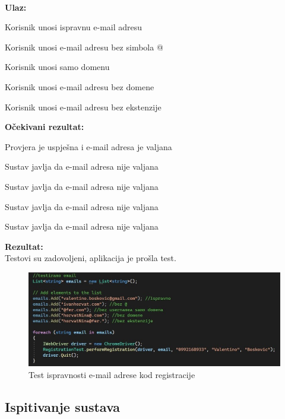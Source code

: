 			\noindent {}\\
			\textbf{Ulaz: }	
			\begin{packed_enum}
				\item Korisnik unosi ispravnu e-mail adresu
				\item Korisnik unosi e-mail adresu bez simbola @
				\item Korisnik unosi samo domenu
				\item Korisnik unosi e-mail adresu bez domene
				\item Korisnik unosi e-mail adresu bez ekstenzije
				
			\end{packed_enum}
			
			\noindent \textbf{Očekivani rezultat:}
			
			\begin{packed_enum}
				\item Provjera je uspješna i e-mail adresa je valjana
				\item Sustav javlja da e-mail adresa nije valjana
				\item Sustav javlja da e-mail adresa nije valjana
				\item Sustav javlja da e-mail adresa nije valjana
				\item Sustav javlja da e-mail adresa nije valjana
				
			\end{packed_enum}
			
			\noindent \textbf{Rezultat:}\\
			Testovi su zadovoljeni, aplikacija je prošla test.\\
			\begin{figure}[H]
				\includegraphics[width=\textwidth]{1test_1_mail.JPEG}
				\centering
				\caption{Test ispravnosti e-mail adrese kod registracije}
				\label{fig:testmail}
			\end{figure}

			
			\subsection{Ispitivanje sustava}
			
